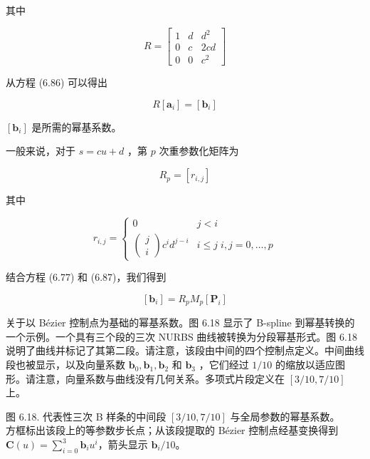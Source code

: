 \documentclass[../main.tex]{subfiles}
\begin{document}
其中

\[
R = \left\lbrack  \begin{matrix} 1 & d & {d}^{2} \\  0 & c & {2cd} \\  0 & 0 & {c}^{2} \end{matrix}\right\rbrack
\]

从方程 (6.86) 可以得出

\[
R\left\lbrack  {\mathbf{a}}_{i}\right\rbrack   = \left\lbrack  {\mathbf{b}}_{i}\right\rbrack   \tag{6.87}
\]

\(\left\lbrack  {\mathbf{b}}_{i}\right\rbrack\) 是所需的幂基系数。

一般来说，对于 \(s = {cu} + d\) ，第 \(p\) 次重参数化矩阵为

\[
{R}_{p} = \left\lbrack  {r}_{i,j}\right\rbrack
\]

其中

\[
{r}_{i,j} = \left\{  \begin{matrix} 0 & j < i \\  \left( \begin{matrix} j \\  i \end{matrix}\right) {c}^{i}{d}^{j - i} & i \leq  j\;i,j = 0,\ldots ,p \end{matrix}\right.  \tag{6.88}
\]

结合方程 (6.77) 和 (6.87)，我们得到

\[
\left\lbrack  {\mathbf{b}}_{i}\right\rbrack   = {R}_{p}{M}_{p}\left\lbrack  {\mathbf{P}}_{i}\right\rbrack   \tag{6.89}
\]

关于以 Bézier 控制点为基础的幂基系数。图 6.18 显示了 B-spline 到幂基转换的一个示例。一个具有三个段的三次 NURBS 曲线被转换为分段幂基形式。图 6.18 说明了曲线并标记了其第二段。请注意，该段由中间的四个控制点定义。中间曲线段也被显示，以及向量系数 \({\mathbf{b}}_{0},{\mathbf{b}}_{1},{\mathbf{b}}_{2}\) 和 \({\mathbf{b}}_{3}\) ，它们经过 \(1/{10}\) 的缩放以适应图形。请注意，向量系数与曲线没有几何关系。多项式片段定义在 \(\left\lbrack  {3/{10},7/{10}}\right\rbrack\) 上。

\begin{center}
\begin{minipage}{21cm}
\vspace*{.6\baselineskip}
\centering
{}
\par\smallskip
图 6.18. 代表性三次 B 样条的中间段 $[3/10,7/10]$ 与全局参数的幂基系数。\\
方框标出该段上的等参数步长点；从该段提取的 Bézier 控制点经基变换得到 $\mathbf C(u)=\sum_{i=0}^3\mathbf b_i u^i$，箭头显示 $\mathbf b_i/10$。
\end{minipage}
\end{center}
\end{document}
